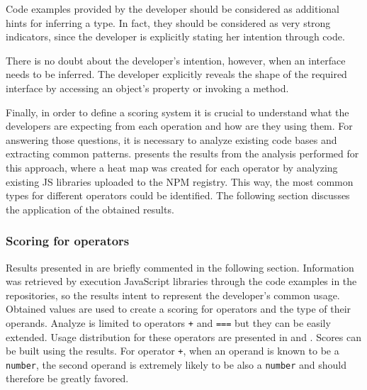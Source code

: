 Code examples provided by the developer should be considered as additional hints for inferring a type. In fact, they should be considered as very strong indicators, since the developer is explicitly stating her intention through code.

There is no doubt about the developer's intention, however, when an interface needs to be inferred. The developer explicitly reveals the shape of the required interface by accessing an object's property or invoking a method.

Finally, in order to define a scoring system it is crucial to understand what the developers are expecting from each operation and how are they using them. For answering those questions, it is necessary to analyze existing code bases and extracting common patterns.  presents the results from the analysis performed for this approach, where a heat map was created for each operator by analyzing existing JS libraries uploaded to the NPM registry. This way, the most common types for different operators could be identified. The following section discusses the application of the obtained results.

\subsubsection{Scoring for operators}
Results presented in  are briefly commented in the following section. Information was retrieved by execution JavaScript libraries through the code examples in the repositories, so the results intent to represent the developer's common usage. Obtained values are used to create a scoring for operators and the type of their operands. Analyze is limited to operators \texttt{+} and \texttt{===} but they can be easily extended. Usage distribution for these operators are presented in  and . Scores can be built using the results. For operator \texttt{+}, when an operand is known to be a \texttt{number}, the second operand is extremely likely to be also a \texttt{number} and should therefore be greatly favored.




